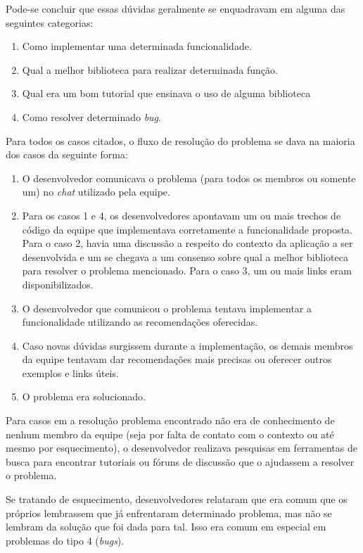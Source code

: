 Pode-se concluir que essas dúvidas geralmente se enquadravam em alguma das seguintes categorias:

\begin{enumerate}
  \item Como implementar uma determinada funcionalidade.
  \item Qual a melhor biblioteca para realizar determinada função.
  \item Qual era um bom tutorial que ensinava o uso de alguma biblioteca
  \item Como resolver determinado \textit{bug}.
\end{enumerate}

Para todos os casos citados, o fluxo de resolução do problema se dava na maioria dos casos da seguinte forma:

\begin{enumerate}
  \item O desenvolvedor comunicava o problema (para todos os membros ou somente um) no \textit{chat} utilizado pela equipe.
  \item Para os casos 1 e 4, os desenvolvedores apontavam um ou mais trechos de código da equipe que implementava corretamente a funcionalidade proposta. Para o caso 2, havia uma discussão a respeito do contexto da aplicação a ser desenvolvida e um se chegava a um consenso sobre qual a melhor biblioteca para resolver o problema mencionado. Para o caso 3, um ou mais links eram disponibilizados.
  \item O desenvolvedor que comunicou o problema tentava implementar a funcionalidade utilizando as recomendações oferecidas.
  \item Caso novas dúvidas surgissem durante a implementação, os demais membros da equipe tentavam dar recomendações mais precisas ou oferecer outros exemplos e links úteis.
  \item O problema era solucionado.
\end{enumerate}

Para casos em a resolução problema encontrado não era de conhecimento de nenhum membro da equipe (seja por falta de contato com o contexto ou até mesmo por esquecimento), o desenvolvedor realizava pesquisas em ferramentas de busca para encontrar tutoriais ou fóruns de discussão que o ajudassem a resolver o problema.

Se tratando de esquecimento, desenvolvedores relataram que era comum que os próprios lembrassem que já enfrentaram determinado problema, mas não se lembram da solução que foi dada para tal. Isso era comum em especial em problemas do tipo 4 (\textit{bugs}).

